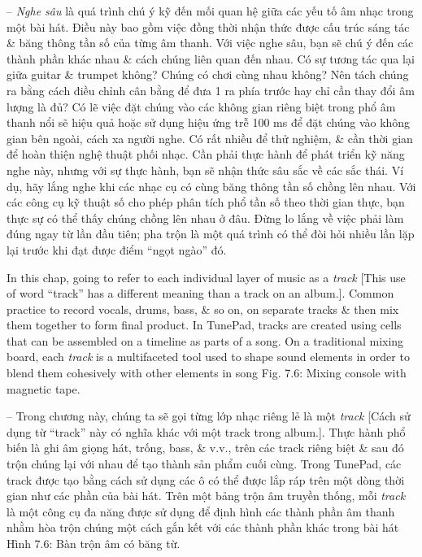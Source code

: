 \documentclass{article}
\begin{document}
\begin{itemize}
\begin{itemize}
		-- {\it Nghe sâu} là quá trình chú ý kỹ đến mối quan hệ giữa các yếu tố âm nhạc trong một bài hát. Điều này bao gồm việc đồng thời nhận thức được cấu trúc sáng tác \& băng thông tần số của từng âm thanh. Với việc nghe sâu, bạn sẽ chú ý đến các thành phần khác nhau \& cách chúng liên quan đến nhau. Có sự tương tác qua lại giữa guitar \& trumpet không? Chúng có chơi cùng nhau không? Nên tách chúng ra bằng cách điều chỉnh cân bằng để đưa 1 ra phía trước hay chỉ cần thay đổi âm lượng là đủ? Có lẽ việc đặt chúng vào các không gian riêng biệt trong phổ âm thanh nổi sẽ hiệu quả hoặc sử dụng hiệu ứng trễ 100 ms để đặt chúng vào không gian bên ngoài, cách xa người nghe. Có rất nhiều {\it} để thử nghiệm, \& cần thời gian để hoàn thiện nghệ thuật phối nhạc. Cần phải thực hành để phát triển kỹ năng nghe này, nhưng với sự thực hành, bạn sẽ nhận thức sâu sắc về các sắc thái. Ví dụ, hãy lắng nghe khi các nhạc cụ có cùng băng thông tần số chồng lên nhau. Với các công cụ kỹ thuật số cho phép phân tích phổ tần số theo thời gian thực, bạn thực sự có thể thấy chúng chồng lên nhau ở đâu. Đừng lo lắng về việc phải làm đúng ngay từ lần đầu tiên; pha trộn là một quá trình có thể đòi hỏi nhiều lần lặp lại trước khi đạt được điểm ``ngọt ngào'' đó.
		
		In this chap, going to refer to each individual layer of music as a {\it track} [This use of word ``track'' has a different meaning than a track on an album.]. Common practice to record vocals, drums, bass, \& so on, on separate tracks \& then mix them together to form final product. In TunePad, tracks are created using cells that can be assembled on a timeline as parts of a song. On a traditional mixing board, each {\it track} is a multifaceted tool used to shape sound elements in order to blend them cohesively with other elements in song {\sf Fig. 7.6: Mixing console with magnetic tape.}
		
		-- Trong chương này, chúng ta sẽ gọi từng lớp nhạc riêng lẻ là một {\it track} [Cách sử dụng từ ``track'' này có nghĩa khác với một track trong album.]. Thực hành phổ biến là ghi âm giọng hát, trống, bass, \& v.v., trên các track riêng biệt \& sau đó trộn chúng lại với nhau để tạo thành sản phẩm cuối cùng. Trong TunePad, các track được tạo bằng cách sử dụng các ô có thể được lắp ráp trên một dòng thời gian như các phần của bài hát. Trên một bảng trộn âm truyền thống, mỗi {\it track} là một công cụ đa năng được sử dụng để định hình các thành phần âm thanh nhằm hòa trộn chúng một cách gắn kết với các thành phần khác trong bài hát {\sf Hình 7.6: Bàn trộn âm có băng từ.}
		

\end{itemize}
\end{itemize}
\end{document}
